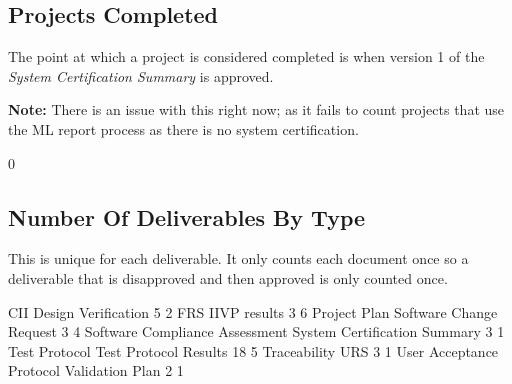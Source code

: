 \documentclass{article}
\begin{document}
\subsection{Projects Completed}

The point at which a project is considered completed is when version 1 of the
\textit{System Certification Summary} is approved.

\textbf{Note:} There is an issue with this right now; as it fails to count projects
that use the ML report process as there is no system certification.

\begin{Schunk}
\begin{Soutput}
[1] 0
\end{Soutput}
\end{Schunk}


\subsection{Number Of Deliverables By Type}
This is unique for each deliverable. It only counts each document once so a deliverable
that is disapproved and then approved is only counted once.

\begin{Schunk}
\begin{Soutput}
                           CII            Design Verification 
                             5                              2 
                           FRS                   IIVP results 
                             3                              6 
                  Project Plan        Software Change Request 
                             3                              4 
Software Compliance Assessment   System Certification Summary 
                             3                              1 
                 Test Protocol          Test Protocol Results 
                            18                              5 
                  Traceability                            URS 
                             3                              1 
      User Acceptance Protocol                Validation Plan 
                             2                              1 
\end{Soutput}
\end{Schunk}
\end{document}
